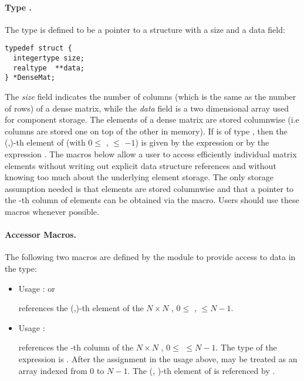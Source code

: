 %
\paragraph{Type .}
The type  is defined to be a pointer to a structure    
with a size and a data field:
\begin{verbatim}
typedef struct {
  integertype size;
  realtype  **data;
} *DenseMat;
\end{verbatim}
The {\em size} field indicates the number of columns (which is the same as the
number of rows) of a dense matrix, while the {\em data} field is a two 
dimensional array used for component storage. 
The elements of a dense matrix are stored columnwise (i.e columns are stored 
one on top of the other in memory). If  is of type , 
then the (,)-th element of  
(with $0 \le$ ,  $\le$ $-1$) 
is given by the expression  
or by the expression . The macros below     
allow a user to access efficiently individual matrix           
elements without writing out explicit data structure           
references and without knowing too much about the underlying   
element storage. The only storage assumption needed is that    
elements are stored columnwise and that a pointer to the -th   
column of elements can be obtained via the  macro.    
Users should use these macros whenever possible.               

\paragraph{Accessor Macros.}
The following two macros are defined by the {\dense} module to provide
access to data in the  type:
\begin{itemize}
\item {}
  \par Usage :  or
  \par {} references the (,)-th element of the $N \times N$
   , $0 \le$ ,  $\le N-1$.
  
\item {}
  \par Usage : 
  \par {} references the -th column of the $N \times N$
   , $0 \le$  $\le N-1$. The type of the expression          
   is  . After the assignment in the usage    
  above,  may be treated as an array indexed from $0$ to $N-1$. 
  The (, )-th element of  is referenced by .  
\end{itemize}

